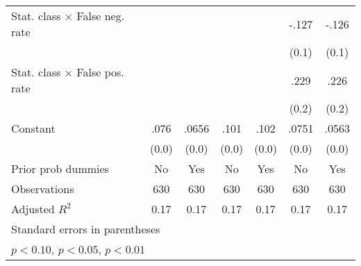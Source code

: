 \begin{table}[htbp]
\begin{tabular}{l*{6}{c}}
Stat. class $\times$ False neg. rate&                  &                  &                  &                  &    -.127         &    -.126         \\
                &                  &                  &                  &                  &    (0.1)         &    (0.1)         \\
Stat. class $\times$ False pos. rate&                  &                  &                  &                  &     .229         &     .226         \\
                &                  &                  &                  &                  &    (0.2)         &    (0.2)         \\
Constant        &     .076\sym{***}&    .0656\sym{***}&     .101\sym{***}&     .102\sym{***}&    .0751\sym{***}&    .0563         \\
                &    (0.0)         &    (0.0)         &    (0.0)         &    (0.0)         &    (0.0)         &    (0.0)         \\
Prior prob dummies &       No         &      Yes         &       No         &      Yes         &       No         &      Yes         \\
\hline
Observations    &      630         &      630         &      630         &      630         &      630         &      630         \\
Adjusted \(R^{2}\)&     0.17         &     0.17         &     0.17         &     0.17         &     0.17         &     0.17         \\
\hline\hline
\multicolumn{7}{l}{\footnotesize Standard errors in parentheses}\\
\multicolumn{7}{l}{\footnotesize \sym{*} \(p<0.10\), \sym{**} \(p<0.05\), \sym{***} \(p<0.01\)}\\
\end{tabular}
\end{table}
